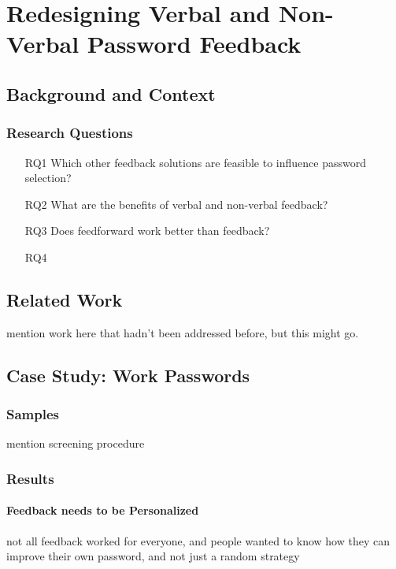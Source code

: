\chapter[Redesigning Verbal and Non-Verbal Password Feedback]{Redesigning Verbal and Non-Verbal Password Feedback}\label{chap:redesigning_feedback}


\section{Background and Context}

\subsection{Research Questions}
\begin{itemize}
	\item[RQ1] Which other feedback solutions are feasible to influence password selection?
	\item[RQ2] What are the benefits of verbal and non-verbal feedback?
	\item[RQ3] Does feedforward work better than feedback?
	\item[RQ4] 
\end{itemize}

\section{Related Work}
mention work here that hadn't been addressed before, but this might go.

\section{Case Study: Work Passwords}

\subsection{Samples}
mention screening procedure
\subsection{Results}

\subsubsection{Feedback needs to be Personalized}
not all feedback worked for everyone, and people wanted to know how they can improve their own password, and not just a random strategy

